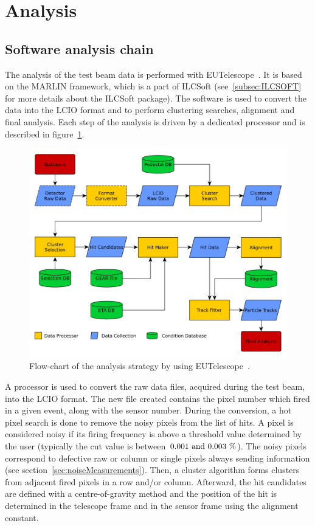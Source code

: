   \section{Analysis}
  \label{sec:X0}

   \subsection{Software analysis chain}

    The analysis of the test beam data is performed with EUTelescope~\cite{Eutel}\cite{Jansen}.
    It is based on the MARLIN framework, which is a part of ILCSoft (see~\ref{subsec:ILCSOFT} for more details about the ILCSoft package).
    The software is used to convert the data into the LCIO format and to perform clustering searches, alignment and final analysis.
    Each step of the analysis is driven by a dedicated processor and is described in figure~\ref{fig:eutel-strategy}.
    
    \begin{figure}[!h]
      \centering
      \includegraphics[width = \textwidth]{Pictures/X0/eutel-strategy.png}
      \caption{Flow-chart of the analysis strategy by using EUTelescope~\cite{EUTelFlowChart}.}
      \label{fig:eutel-strategy}
    \end{figure}

    A processor is used to convert the raw data files, acquired during the test beam, into the LCIO format.
    The new file created contains the pixel number which fired in a given event, along with the sensor number.
    During the conversion, a hot pixel search is done to remove the noisy pixels from the list of hits.
    A pixel is considered noisy if its firing frequency is above a threshold value determined by the user (typically the cut value is between $0.001~\rm{and}~0.003~\%$).
    The noisy pixels correspond to defective raw or column or single pixels always sending information (see section~\ref{sec:noiseMeasurements}).
    Then, a cluster algorithm forms clusters from adjacent fired pixels in a row and/or column.
    Afterward, the hit candidates are defined with a centre-of-gravity method and the position of the hit is determined in the telescope frame and in the sensor frame using the alignment constant.

